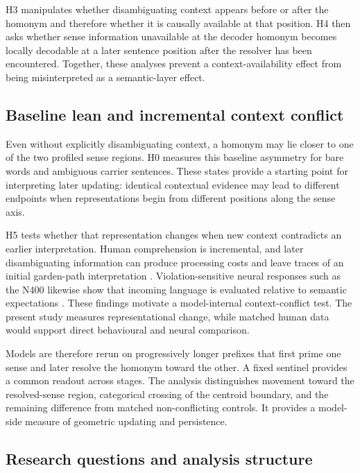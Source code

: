 \documentclass[conference]{IEEEtran}
\begin{document}
H3 manipulates whether disambiguating context appears before or after the
homonym and therefore whether it is causally available at that position. H4
then asks whether sense information unavailable at the decoder homonym becomes
locally decodable at a later sentence position after the resolver has been
encountered. Together, these analyses prevent a context-availability effect
from being misinterpreted as a semantic-layer effect.

\subsection{Baseline lean and incremental context conflict}

Even without explicitly disambiguating context, a homonym may lie closer to
one of the two profiled sense regions. H0 measures this baseline asymmetry for
bare words and ambiguous carrier sentences. These states provide a starting
point for interpreting later updating: identical contextual evidence may lead
to different endpoints when representations begin from different positions
along the sense axis.

H5 tests whether that representation changes when new context contradicts an
earlier interpretation. Human comprehension is incremental, and later
disambiguating information can produce processing costs and leave traces of an
initial garden-path interpretation \citep{frazier1982,christianson2001}.
Violation-sensitive neural responses such as the N400 likewise show that
incoming language is evaluated relative to semantic expectations
\citep{ryskin2023,koelbl2026}. These findings motivate a model-internal
context-conflict test. The present
study measures representational change, while matched human data would support
direct behavioural and neural comparison.

Models are therefore rerun on progressively longer prefixes that first prime
one sense and later resolve the homonym toward the other. A fixed sentinel
provides a common readout across stages. The analysis distinguishes movement
toward the resolved-sense region, categorical crossing of the centroid
boundary, and the remaining difference from matched non-conflicting controls.
It provides a model-side measure of geometric updating and persistence.


\subsection{Research questions and analysis structure}
\label{sec:research-questions}
\end{document}
